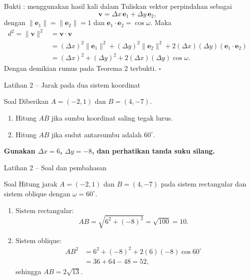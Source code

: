 \documentclass[aspectratio=169,11pt]{beamer}
\begin{document}
\begin{frame}{Bukti : menggunakan hasil kali dalam}
    Tuliskan vektor perpindahan sebagai
    \[
        \mathbf v=\Delta x\,\mathbf e_1+\Delta y\,\mathbf e_2,
    \]
    dengan $\|\mathbf e_1\|=\|\mathbf e_2\|=1$ dan
    $\mathbf e_1\cdot\mathbf e_2=\cos\omega$. Maka
    \[
    \begin{aligned}
        d^2=\|\mathbf v\|^2
        &=\mathbf v\cdot\mathbf v\\
        &=(\Delta x)^2\|\mathbf e_1\|^2
          +(\Delta y)^2\|\mathbf e_2\|^2
          +2(\Delta x)(\Delta y)(\mathbf e_1\cdot\mathbf e_2)\\
        &=(\Delta x)^2+(\Delta y)^2
          +2(\Delta x)(\Delta y)\cos\omega.
    \end{aligned}
    \]
    Dengan demikian rumus pada Teorema 2 terbukti. \hfill$\square$
\end{frame}

\begin{frame}{Latihan 2 -- Jarak pada dua sistem koordinat}
    \begin{block}{Soal}
        Diberikan $A=(-2,1)$ dan $B=(4,-7)$.
        \begin{enumerate}
            \item Hitung $AB$ jika sumbu koordinat saling tegak lurus.
            \item Hitung $AB$ jika sudut antarsumbu adalah $60^\circ$.
        \end{enumerate}
    \end{block}

    \vspace{0.35cm}
    \centering
    \color{AcademicBlue}\bfseries Gunakan $\Delta x=6$, $\Delta y=-8$, dan perhatikan tanda suku silang.
\end{frame}

\begin{frame}{Latihan 2 -- Soal dan pembahasan}
    \begin{exampleblock}{Soal}
        Hitung jarak $A=(-2,1)$ dan $B=(4,-7)$ pada sistem rectangular dan
        sistem oblique dengan $\omega=60^\circ$.
    \end{exampleblock}

    \begin{enumerate}
        \item Sistem rectangular:
        \[
            AB=\sqrt{6^2+(-8)^2}=\sqrt{100}=\boxed{10}.
        \]
        \item Sistem oblique:
        \[
        \begin{aligned}
            AB^2&=6^2+(-8)^2+2(6)(-8)\cos60^\circ\\
                &=36+64-48=52,
        \end{aligned}
        \]
        sehingga $AB=\boxed{2\sqrt{13}}$.
    \end{enumerate}
\end{frame}
\end{document}
